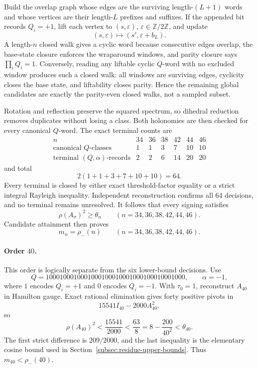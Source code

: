 Build the overlap graph whose edges are the surviving length-\((L+1)\)
words and whose vertices are their length-\(L\) prefixes and suffixes.
If the appended bit records \(Q_i=+1\), lift each vertex to
\((s,\varepsilon)\), \(\varepsilon\in\mathbb Z/2\mathbb Z\), and update
\[
(s,\varepsilon)\longmapsto(s',\varepsilon+b_L).
\]
A length-\(n\) closed walk gives a cyclic word because consecutive edges
overlap, the base-state closure enforces the wraparound windows, and parity
closure says \(\prod_iQ_i=1\).  Conversely, reading any liftable cyclic
\(Q\)-word with no excluded window produces such a closed walk: all windows
are surviving edges, cyclicity closes the base state, and liftability closes
parity.  Hence the remaining global candidates are exactly the parity-even
closed walks, not a sampled subset.

Rotation and reflection preserve the squared spectrum, so dihedral reduction
removes duplicates without losing a class.  Both holonomies are then checked
for every canonical \(Q\)-word.  The exact terminal counts are
\[
\begin{array}{c|rrrrrr}
n&34&36&38&42&44&46\\ \hline
\text{canonical \(Q\)-classes}&1&1&3&7&10&10\\
\text{terminal \((Q,\alpha)\)-records}&2&2&6&14&20&20
\end{array}
\]
and total
\[
2(1+1+3+7+10+10)=64.
\]
Every terminal is closed by either exact threshold-factor equality or a
strict integral Rayleigh inequality.  Independent reconstruction confirms
all 64 decisions, and no terminal remains unresolved.
It follows that every signing satisfies
\[
\rho(A_\sigma)^2\geq\theta_n
\qquad(n=34,36,38,42,44,46).
\]
Candidate attainment then proves
\[
m_n=\rho_-(n)
\qquad(n=34,36,38,42,44,46).
\]

\paragraph{Order \(40\).}
This order is logically separate from the six lower-bound decisions.  Use
\[
Q=1000100010001000100010001000100010001000,
\qquad \alpha=-1,
\]
where \(1\) encodes \(Q_i=+1\) and \(0\) encodes \(Q_i=-1\).  With
\(\tau_0=1\), reconstruct \(A_{40}\) in Hamilton gauge.  Exact
rational elimination gives forty positive pivots in
\[
15541I_{40}-2000A_{40}^2,
\]
so
\[
\rho(A_{40})^2<\frac{15541}{2000}
<\frac{63}{8}
=8-\frac{200}{40^2}<\theta_{40}.
\]
The first strict difference is \(209/2000\), and the last inequality is the
elementary cosine bound used in Section~\ref{subsec:residue-upper-bounds}.
Thus \(m_{40}<\rho_-(40)\).

